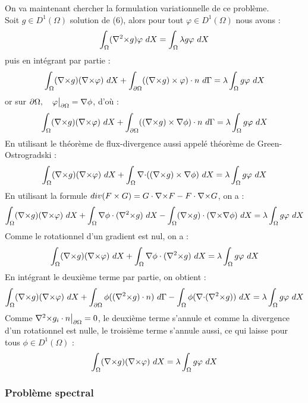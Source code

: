 On va maintenant chercher la formulation variationnelle de ce problème.\\
Soit $g\in D^1(\Omega)$ solution de (6), alors pour tout $\varphi\in D^1(\Omega)$ nous avons :
\[
\int_\Omega (\rott g)\varphi\ dX = \int_\Omega\lambda g\varphi\ dX
\]
puis en intégrant par partie :
\[
\int_\Omega (\rot g)(\rot\varphi)\ dX + \int_{\partial\Omega} ((\rot g)\times \varphi)\cdot n\ d\Gamma = \lambda\int_\Omega g\varphi\ dX
\]
or sur $\partial\Omega,\quad \varphi{\big\rvert_{\partial\Omega}}={\nabla}\phi$, d'où : 
\[
\int_\Omega ({\nabla\times} g)({\nabla\times}\varphi)\ dX + \int_{\partial\Omega} (({\nabla\times} g)\times {\nabla}\phi)\cdot n\ d\Gamma = \lambda\int_\Omega g\varphi\ dX
\]
En utilisant le théorème de flux-divergence aussi appelé théorème de Green-Ostrogradski :
\[
\int_\Omega ({\nabla\times} g)({\nabla\times}\varphi)\ dX + \int_\Omega {\nabla\cdot}(({\nabla\times} g)\times {\nabla}\phi)\ dX = \lambda\int_\Omega g\varphi\ dX
\]
En utilisant la formule $div(F\times G) = G\cdot {\nabla\times} F - F\cdot {\nabla\times} G$, on a :
\[
\int_\Omega ({\nabla\times} g)({\nabla\times}\varphi)\ dX + \int_\Omega {\nabla}\phi\cdot({\nabla^2\times} g)\ dX -\int_\Omega ({\nabla\times} g)\cdot ({\nabla\times}{\nabla}\phi)\ dX  = \lambda\int_\Omega g\varphi\ dX
\]
Comme le rotationnel d'un gradient est nul, on a :
\[
\int_\Omega (\rot g)(\rot\varphi)\ dX + \int_\Omega \grad\phi\cdot(\rott g)\ dX  = \lambda\int_\Omega g\varphi\ dX
\]
En intégrant le deuxième terme par partie, on obtient : 
\[
\int_\Omega ({\nabla\times} g)({\nabla\times}\varphi)\ dX + \int_{\partial\Omega} \phi(({\nabla^2\times} g)\cdot n)\ d\Gamma - \int_\Omega \phi({\nabla\cdot}({\nabla^2\times} g))\ dX  = \lambda\int_\Omega g\varphi\ dX
\]
Comme ${\nabla^2\times}  g_i\cdot n{\big\rvert_{\partial\Omega}} = 0$, le deuxième terme s'annule et comme la divergence d'un rotationnel est nulle, le troisième terme s'annule aussi, ce qui laisse pour tous $\phi\in D^1(\Omega)$ :
\begin{eqnarray}
\label{fveigen}
\int_\Omega ({\nabla\times} g)({\nabla\times}\varphi)\ dX = \lambda\int_\Omega g\varphi\ dX
\end{eqnarray}

\subsubsection{Problème spectral}
\label{spectre}

